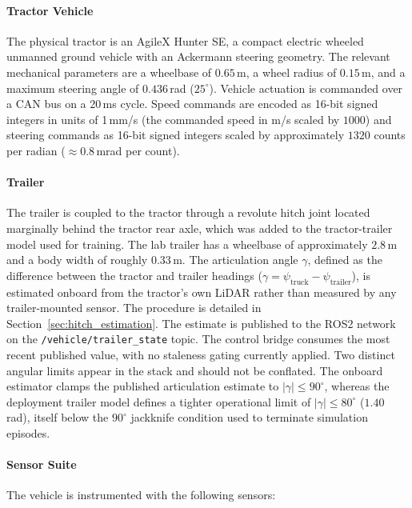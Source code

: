 \paragraph{Tractor Vehicle}

The physical tractor is an AgileX Hunter SE, a compact electric wheeled unmanned ground vehicle with an Ackermann steering geometry. The relevant mechanical parameters are a wheelbase of $0.65$\,m, a wheel radius of $0.15$\,m, and a maximum steering angle of $0.436$\,rad ($25^\circ$). Vehicle actuation is commanded over a CAN bus on a 20\,ms cycle. Speed commands are encoded as 16-bit signed integers in units of 1\,mm/s (the commanded speed in m/s scaled by $1000$) and steering commands as 16-bit signed integers scaled by approximately $1320$ counts per radian ($\approx 0.8$\,mrad per count).

\paragraph{Trailer}

The trailer is coupled to the tractor through a revolute hitch joint located marginally behind the tractor rear axle, which was added to the tractor-trailer model used for training. The lab trailer has a wheelbase of approximately $2.8$\,m and a body width of roughly $0.33$\,m. The articulation angle $\gamma$, defined as the difference between the tractor and trailer headings ($\gamma = \psi_\text{truck} - \psi_\text{trailer}$), is estimated onboard from the tractor's own LiDAR rather than measured by any trailer-mounted sensor. The procedure is detailed in Section~\ref{sec:hitch_estimation}. The estimate is published to the ROS2 network on the \texttt{/vehicle/trailer\_state} topic. The control bridge consumes the most recent published value, with no staleness gating currently applied. Two distinct angular limits appear in the stack and should not be conflated. The onboard estimator clamps the published articulation estimate to $|\gamma| \le 90^\circ$, whereas the deployment trailer model defines a tighter operational limit of $|\gamma| \le 80^\circ$ ($1.40$\,rad), itself below the $90^\circ$ jackknife condition used to terminate simulation episodes.

\paragraph{Sensor Suite}

The vehicle is instrumented with the following sensors:


